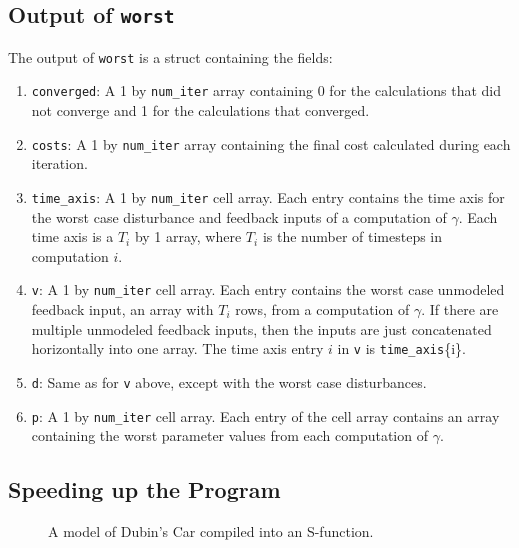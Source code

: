 \documentclass{article}
\begin{document}
\subsection{Output of \texttt{worst}}
The output of \texttt{worst} is a struct containing the fields:
\begin{enumerate}
\item \texttt{converged}: A 1 by \texttt{num\_iter} array containing 0 for the
calculations that did not converge and 1 for the calculations that converged.

\item \texttt{costs}: A 1 by \texttt{num\_iter} array containing the final cost
calculated during each iteration.

\item \texttt{time\_axis}: A 1 by \texttt{num\_iter} cell array. Each entry
contains the time axis for the worst case disturbance and feedback inputs of a
computation of $\gamma$. Each time axis is a $T_i$ by 1 array, where $T_i$ is
the number of timesteps in computation $i$.

\item \texttt{v}: A 1 by \texttt{num\_iter} cell array. Each entry contains the
worst case unmodeled feedback input, an array with $T_i$ rows, from a
computation of $\gamma$. If there are multiple unmodeled feedback inputs, then
the inputs are just concatenated horizontally into one array. The time axis
entry $i$ in \texttt{v} is \texttt{time\_axis}\{i\}.

\item \texttt{d}: Same as for \texttt{v} above, except with the worst case
disturbances.

\item \texttt{p}: A 1 by \texttt{num\_iter} cell array. Each entry of the cell
array contains an array containing the worst parameter values from each
computation of $\gamma$.
\end{enumerate}


\subsection{Speeding up the Program}

\begin{figure}
\begin{center}
\caption{A model of Dubin's Car compiled into an S-function.}
\end{center}
\label{sfunc}
\end{figure}
\end{document}
